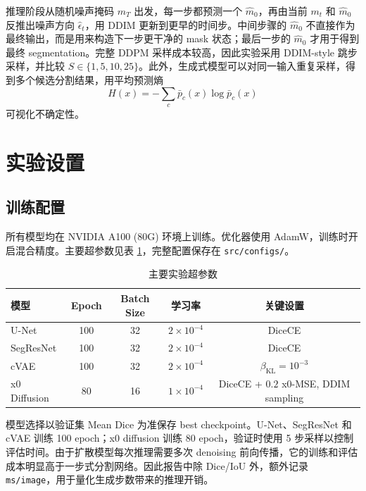 \documentclass[lang=cn,11pt,a4paper]{elegantpaper}
\begin{document}
推理阶段从随机噪声掩码 $m_T$ 出发，每一步都预测一个 $\hat{m}_0$，再由当前 $m_t$ 和 $\hat{m}_0$ 反推出噪声方向 $\hat{\epsilon}_t$，用 DDIM 更新到更早的时间步。中间步骤的 $\hat{m}_0$ 不直接作为最终输出，而是用来构造下一步更干净的 mask 状态；最后一步的 $\hat{m}_0$ 才用于得到最终 segmentation。完整 DDPM 采样成本较高，因此实验采用 DDIM-style 跳步采样，并比较 $S\in\{1,5,10,25\}$。此外，生成式模型可以对同一输入重复采样，得到多个候选分割结果，用平均预测熵
\[
H(x)=-\sum_c \bar{p}_c(x)\log\bar{p}_c(x)
\]
可视化不确定性。

\section{实验设置}

\subsection{训练配置}

所有模型均在 NVIDIA A100 (80G) 环境上训练。优化器使用 AdamW，训练时开启混合精度。主要超参数见表 \ref{tab:hparams}，完整配置保存在 \texttt{src/configs/}。

\begin{table}[H]
\centering
\caption{主要实验超参数}
\label{tab:hparams}
\begin{tabular}{lcccc}
\toprule
模型 & Epoch & Batch Size & 学习率 & 关键设置 \\
\midrule
U-Net & 100 & 32 & $2\times10^{-4}$ & DiceCE \\
SegResNet & 100 & 32 & $2\times10^{-4}$ & DiceCE \\
cVAE & 100 & 32 & $2\times10^{-4}$ & $\beta_{\mathrm{KL}}=10^{-3}$ \\
x0 Diffusion & 80 & 16 & $1\times10^{-4}$ & DiceCE + $0.2$ x0-MSE, DDIM sampling \\
\bottomrule
\end{tabular}
\end{table}

模型选择以验证集 Mean Dice 为准保存 best checkpoint。U-Net、SegResNet 和 cVAE 训练 100 epoch；x0 diffusion 训练 80 epoch，验证时使用 5 步采样以控制评估时间。由于扩散模型每次推理需要多次 denoising 前向传播，它的训练和评估成本明显高于一步式分割网络。因此报告中除 Dice/IoU 外，额外记录 \texttt{ms/image}，用于量化生成步数带来的推理开销。
\end{document}
